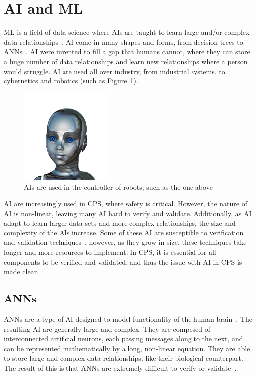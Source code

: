 \section{\acf{AI} and \acf{ML}}
\acf{ML} is a field of data science where \acfp{AI} are taught to learn large and/or complex data relationships~\cite{ai}.
\ac{AI} come in many shapes and forms, from decision trees to \acfp{ANN}~\cite{ai-types}.
\ac{AI} were invented to fill a gap that humans cannot, where they can store a huge number of data relationships and learn new relationships where a person would struggle.
\ac{AI} are used all over industry, from industrial systems, to cybernetics and robotics (such as Figure~\ref{fig:ai-girl}).

\begin{figure}[H]
	\centering
	\includegraphics[width=0.4\textwidth]{Content/fig/ai-girl.png}
	\caption{\acp{AI} are used in the controller of robots, such as the one above~\cite{robotgirl-pic} \label{fig:ai-girl}}
\end{figure}

\ac{AI} are increasingly used in \ac{CPS}, where safety is critical.
However, the nature of \ac{AI} is non-linear, leaving many \ac{AI} hard to verify and validate.
Additionally, as \ac{AI} adapt to learn larger data sets and more complex relationships, the size and complexity of the \acp{AI} increase.
Some of these \ac{AI} are susceptible to verification and validation techniques~\cite{aiverify}, however, as they grow in size, these techniques take longer and more resources to implement.
In \ac{CPS}, it is essential for all components to be verified and validated, and thus the issue with \ac{AI} in \ac{CPS} is made clear.

\subsection{\acfp{ANN}}
\acp{ANN} are a type of \ac{AI} designed to model functionality of the human brain~\cite{kohonen1988introduction}.
The resulting \ac{AI} are generally large and complex.
They are composed of interconnected artificial neurons, each passing messages along to the next, and can be represented mathematically by a long, non-linear equation.
They are able to store large and complex data relationships, like their biological counterpart.
The result of this is that \acp{ANN} are extremely difficult to verify or validate~\cite{menzies2005verification}.

